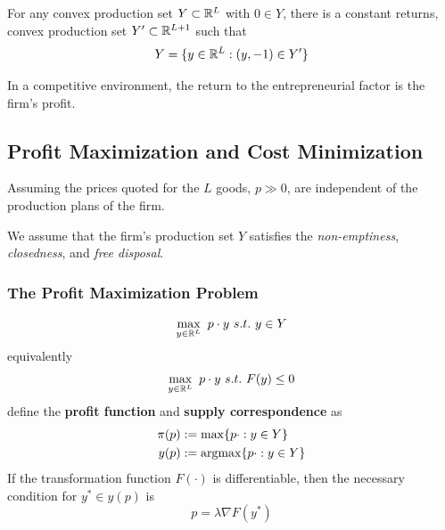 \documentclass{report}
\begin{document}
	 		\begin{proposition}
	 			For any convex production set $Y \subset \mathbb{R}^L$ with $0 \in Y$, there is a constant returns, convex production set $Y' \subset \mathbb{R}^{L+1}$ such that
	 			\begin{equation}
	 				Y = \{y \in \mathbb{R}^L: (y, -1) \in Y'\}
	 			\end{equation}
	 		\end{proposition}
	 		
	 		\begin{remark}
	 			In a competitive environment, the return to the entrepreneurial factor is the firm's profit.
	 		\end{remark}

	 	\subsection{Profit Maximization and Cost Minimization}
	 		\begin{assumption}
	 			Assuming the prices quoted for the $L$ goods, $p \gg 0$, are independent of the production plans of the firm.
	 		\end{assumption}
	 		
	 		\begin{assumption}
	 			We assume that the firm's production set $Y$ satisfies the \emph{non-emptiness}, \emph{closedness}, and \emph{free disposal}.
	 		\end{assumption}
	 		
	 		\subsubsection{The Profit Maximization Problem}
	 		\begin{definition}[PMP]
	 			\begin{gather}
	 				\max_{y \in \mathbb{R}^L}\ p \cdot y\ s.t.\ y \in Y
	 			\end{gather}
	 			equivalently
	 			\begin{gather}
	 				\max_{y \in \mathbb{R}^L}\ p \cdot y\ s.t.\ F(y) \leq 0
	 			\end{gather}
	 			define the \textbf{profit function} and \textbf{supply correspondence} as 
	 			\begin{align}
	 				\pi(p) &:= \max\{p \cdot : y \in Y\} \\
	 				y(p) &:= \operatorname*{argmax}\{p \cdot : y \in Y\}
	 			\end{align}
	 			If the transformation function $F(\cdot)$ is differentiable, then the necessary condition for $y^* \in y(p)$ is
	 			\begin{equation}
	 				p = \lambda \nabla F (y^*)
	 			\end{equation}
	 		\end{definition}
	 		
\end{document}
